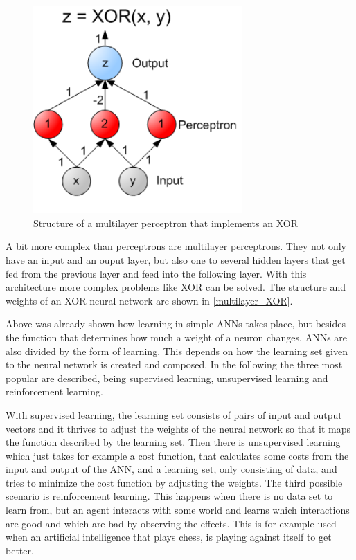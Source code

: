 \begin{figure}[ht]
	\centering
  \includegraphics[width=8cm]{figures/multilayer_XOR}
	\caption[Structure of a multilayer perceptron that implements an XOR]{Structure of a multilayer perceptron that implements an XOR \protect\footnotemark}
	\label{multilayer_XOR}
\end{figure}

A bit more complex than perceptrons are multilayer perceptrons. They not only have an input and an ouput layer, but also one to several hidden layers that get fed from the previous layer and feed into the following layer. With this architecture more complex problems like XOR can be solved. The structure and weights of an XOR neural network are shown in \autoref{multilayer_XOR}.

Above was already shown how learning in simple ANNs takes place, but besides the function that determines how much a weight of a neuron changes, ANNs are also divided by the form of learning. This depends on how the learning set given to the neural network is created and composed. In the following the three most popular are described, being supervised learning, unsupervised learning and reinforcement learning.

With supervised learning, the learning set consists of pairs of input and output vectors and it thrives to adjust the weights of the neural network so that it maps the function described by the learning set. Then there is unsupervised learning which just takes for example a cost function, that calculates some costs from the input and output of the ANN, and a learning set, only consisting of data, and tries to minimize the cost function by adjusting the weights. The third possible scenario is reinforcement learning. This happens when there is no data set to learn from, but an agent interacts with some world and learns which interactions are good and which are bad by observing the effects. This is for example used when an artificial intelligence that plays chess, is playing against itself to get better.

